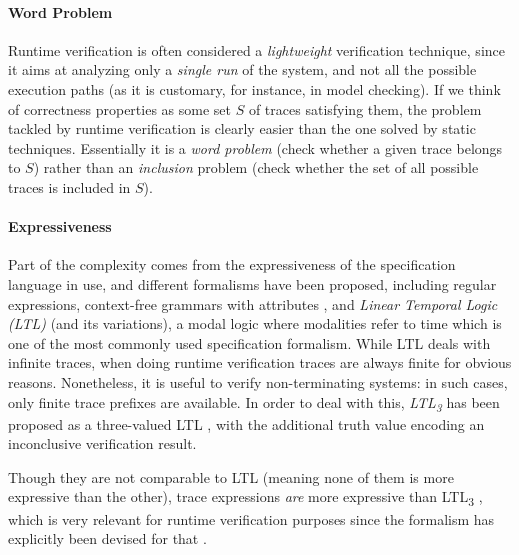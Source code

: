 \paragraph{Word Problem}
Runtime verification is often considered a \emph{lightweight} verification technique, since it aims at analyzing only a \emph{single run} of the system, and not all the possible execution paths (as it is customary, for instance, in model checking).
If we think of correctness properties as some set \(S\) of traces satisfying them, the problem tackled by runtime verification is clearly easier than the one solved by static techniques.
Essentially it is a \emph{word problem} (check whether a given trace belongs to \(S\)) rather than an \emph{inclusion} problem (check whether the set of all possible traces is included in \(S\)).


\paragraph{Expressiveness}
Part of the complexity comes from the expressiveness of the specification language in use, and different formalisms have been proposed,
including regular expressions, context-free grammars with attributes \cite{de2014combining,BoerEtAl14},
and \emph{Linear Temporal Logic (LTL)} \cite{ltl} (and its variations), a modal logic where modalities refer to time which is
one of the most commonly used specification formalism. 
While LTL deals with infinite traces, when doing runtime verification traces are always finite for obvious reasons.
Nonetheless, it is useful to verify non-terminating systems: in such cases, only finite trace prefixes are available.
In order to deal with this, \emph{LTL\textsubscript{3}} has been proposed as a three-valued LTL \cite{ltl3}, with the additional truth value encoding an inconclusive verification result.

Though they are not comparable to LTL (meaning none of them is more expressive than the other), trace expressions \emph{are} more expressive than LTL\textsubscript{3} \cite{ancona2016comparing}, which is very relevant for runtime verification purposes since the formalism has explicitly been devised for that \cite{ltl3}.

